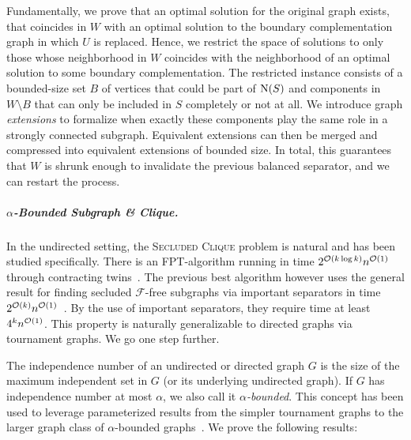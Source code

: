 Fundamentally, we prove that an optimal solution for the original graph exists, that coincides in $W$ with an optimal solution to the boundary complementation graph in which $U$ is replaced. Hence, we restrict the space of solutions to only those whose neighborhood in $W$ coincides with the neighborhood of an optimal solution to some boundary complementation. The restricted instance consists of a bounded-size set $B$ of vertices that could be part of $\operatorname{N}({S})$ and components in $W \setminus B$ that can only be included in $S$ completely or not at all. We introduce graph \emph{extensions} to formalize when exactly these components play the same role in a strongly connected subgraph. Equivalent extensions can then be merged and compressed into equivalent extensions of bounded size.
In total, this guarantees that $W$ is shrunk enough to invalidate the previous balanced separator, and we can restart the process.

\subparagraph*{$\alpha$-Bounded Subgraph \& Clique.}

In the undirected setting, the \textsc{Secluded Clique} problem is natural and has been studied specifically. There is an FPT-algorithm running in time $2^{\mathcal{O}(k \log k)}n^{\mathcal{O}(1)}$ through contracting twins~\cite{golovach2020finding}.
The previous best algorithm however uses the general result for finding secluded $\mathcal{F}$-free subgraphs via important separators in time $2^{\mathcal{O}(k)}n^{\mathcal{O}(1)}$~\cite{jansen2023single}. By the use of important separators, they require time at least $4^kn^{\mathcal{O}(1)}$. 
This property is naturally generalizable to directed graphs via tournament graphs. We go one step further.

The independence number of an undirected or directed graph $G$ is the size of the maximum independent set in $G$ (or its underlying undirected graph).
If $G$ has independence number at most $\alpha$, we also call it \emph{$\alpha$-bounded}. This concept has been used to leverage parameterized results from the simpler tournament graphs to the larger graph class of $\alpha$-bounded graphs~\cite{sahu2023kernelization,fradkin2015edge,misra2023sub}. We prove the following results:

